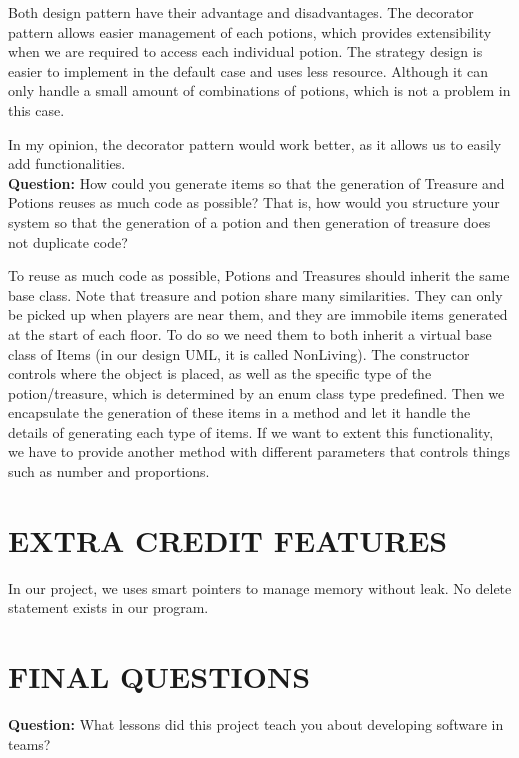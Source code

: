 \documentclass[11pt]{article}
\theoremstyle{plain} \newtheorem{theorem*}{Theorem}[subsection]
\begin{document}
Both design pattern have their advantage and disadvantages. The decorator
pattern allows easier management of each potions, which provides extensibility
when we are required to access each individual potion. The strategy design is
easier to implement in the default case and uses less resource. Although it can
only handle a small amount of combinations of potions, which is not a problem
in this case.  

In my opinion, the decorator pattern would work better, as it allows us to
easily add functionalities. \\

\textbf{Question:}
How could you generate items so that the generation of Treasure and Potions
reuses as much code as possible? That is, how would you structure your system
so that the generation of a potion and then generation of treasure does not
duplicate code? 

To reuse as much code as possible, Potions and Treasures should inherit the
same base class. Note that treasure and potion share many similarities. They
can only be picked up when players are near them, and they are immobile items
generated at the start of each floor. To do so we need them to both inherit a
virtual base class of Items (in our design UML, it is called NonLiving). The
constructor controls where the object is placed, as well as the specific type
of the potion/treasure, which is determined by an enum class type predefined.
Then we encapsulate the generation of these items in a method and let it handle
the details of generating each type of items. If we want to extent this
functionality, we have to provide another method with different parameters that
controls things such as number and proportions. 



\section{EXTRA CREDIT FEATURES}

In our project, we uses smart pointers to manage memory without leak. No delete
statement exists in our program.  




\section{FINAL QUESTIONS}

\textbf{Question:}
What lessons did this project teach you about developing software in teams? 
\end{document}
